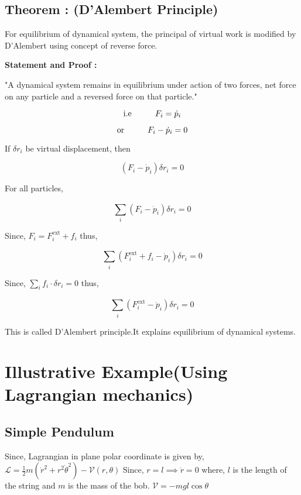 \documentclass[12pt, a4paper]{article} %
\begin{document}
\subsection{Theorem : (D'Alembert Principle)}

\BgThispage

For equilibrium of dynamical system, the principal of virtual work is modified by D'Alembert using concept of reverse force.

{\bf Statement and Proof :}

"A dynamical system remains in equilibrium under action of two forces, net force on any particle and a reversed force on that particle."

\[\mbox{i.e}\hspace*{1cm} F_i = \dot{p}_i\]

\[\mbox{or}\hspace*{1cm} F_i - \dot{p}_i = 0\]


If $\delta r_i$ be virtual displacement, then 

\[\left( F_i - \dot{p}_i  \right)\delta r_i = 0\]

For all particles,

\[\sum_{i}^{}\left( F_i - \dot{p}_i  \right)\delta r_i = 0\]

Since, $F_i = F^{\mbox{ext}}_i + f_i$ thus,

\[\sum_{i}^{}\left( F^{\mbox{ext}}_i + f_i - \dot{p}_i\right)\delta r_i = 0\]

Since, $\sum_{i}^{}f_i\cdot \delta r_i = 0$ thus,

\[\boxed{\sum_{i}^{}\left( F^{\mbox{ext}}_i - \dot{p}_i \right)\delta r_i = 0}\]

This is called D'Alembert principle.It explains equilibrium of dynamical systems.

\BgThispage

\section{Illustrative Example(Using Lagrangian mechanics)}

\subsection{Simple Pendulum}

Since, Lagrangian in plane polar coordinate is given by,
\vspace*{4mm}
$\displaystyle \mathscr{L} = \frac{1}{2}m\left(\dot{r}^2 + r^2\dot{\theta}^2\right) - \mathcal{V}\left(r, \theta\right)$
\vspace*{4mm}
Since, $r = l\implies \dot{r} = 0 $ where, $l$ is the length of the string and $m$ is the mass of the bob.
\vspace*{4mm}
$\displaystyle \mathcal{V} = -mgl\cos\theta$
\end{document}
